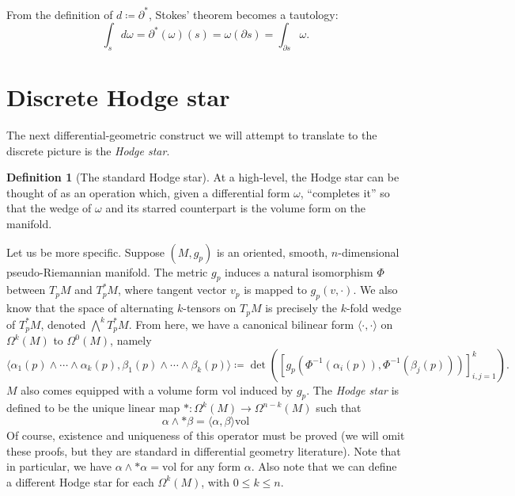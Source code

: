 \documentclass[aps,pra,showpacs,notitlepage,onecolumn,superscriptaddress,nofootinbib]{revtex4-1}
\newcommand{\Wedge}{\bigwedge}
\theoremstyle{definition}
\newtheorem{definition}{Definition}[section]
\begin{document}
\noindent From the definition of $d \coloneqq \partial^{*}$, Stokes' theorem becomes a tautology:
\begin{equation}
  \displaystyle\int_{s} d\omega = \partial^{*}(\omega)(s) = \omega(\partial s) = \displaystyle\int_{\partial s} \omega.
\end{equation}

\section{Discrete Hodge star}

\noindent The next differential-geometric construct we will attempt to translate to the discrete picture is the \emph{Hodge star}.

\begin{definition}[The standard Hodge star]
  At a high-level, the Hodge star can be thought of as an operation which, given a differential form $\omega$, ``completes it'' so that the wedge of $\omega$
  and its starred counterpart is the volume form on the manifold.

  Let us be more specific. Suppose $(M, g_p)$ is an oriented, smooth, $n$-dimensional pseudo-Riemannian manifold. The metric $g_p$ induces a natural
  isomorphism $\Phi$ between $T_p M$ and $T_p^{*} M$, where tangent vector $v_p$ is mapped to $g_p(v, \cdot)$. We also know that the space of alternating $k$-tensors on $T_p M$
  is precisely the $k$-fold wedge of $T_p^{*} M$, denoted $\Wedge^{k} T_p^{*} M$. From here, we have a canonical bilinear form $\langle\cdot, \cdot\rangle$ on $\Omega^{k}(M)$ to $\Omega^{0}(M)$, namely
  \begin{equation}
    \langle \alpha_1(p) \wedge \cdots \wedge \alpha_k(p), \beta_1(p) \wedge \cdots \wedge \beta_k(p) \rangle \coloneqq \det \left( \left[ g_p(\Phi^{-1}(\alpha_i(p)), \Phi^{-1}(\beta_j(p))) \right]_{i, j = 1}^{k} \right).
  \end{equation}
  $M$ also comes equipped with a volume form $\text{vol}$ induced by $g_p$. The \emph{Hodge star} is defined to be the unique linear map $* : \Omega^{k}(M) \rightarrow \Omega^{n - k}(M)$
  such that
  \begin{equation}
    \alpha \wedge * \beta = \langle \alpha, \beta \rangle \text{vol}
    \end{equation}
  Of course, existence and uniqueness of this operator must be proved (we will omit these proofs, but they are standard in differential geometry literature). Note that in particular, we have
  $\alpha \wedge * \alpha = \text{vol}$ for any form $\alpha$. Also note that we can define a different Hodge star for each $\Omega^{k}(M)$, with $0 \leq k \leq n$.
\end{definition}
\end{document}

